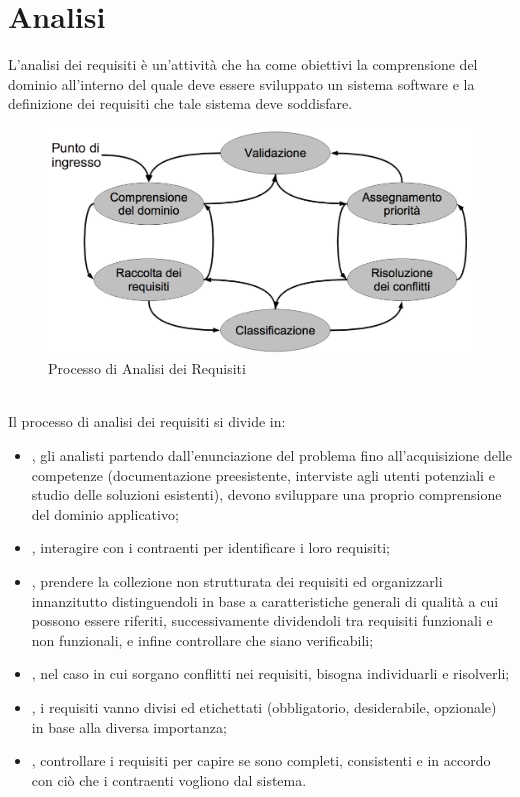 \section{Analisi}
L'analisi dei requisiti \`e un'attivit\`a che ha come obiettivi la comprensione
del dominio all'interno del quale deve essere sviluppato un sistema software e
la definizione dei requisiti che tale sistema deve soddisfare.\\ 
\begin{figure}[h]
  \centering
  \includegraphics[height=6cm]{img/NP/ProcessoAR.png}
\caption{Processo di Analisi dei Requisiti}
\end{figure}\\
Il processo di analisi dei requisiti si divide in:
\begin{itemize}
  \item {}, gli analisti partendo dall'enunciazione
  del problema fino all'acquisizione delle competenze (documentazione
  preesistente, interviste agli utenti potenziali e studio delle soluzioni
  esistenti), devono sviluppare una proprio comprensione del dominio
  applicativo;
  \item {}, interagire con i contraenti per
  identificare i loro requisiti;
  \item {}, prendere la collezione non strutturata dei
  requisiti ed organizzarli innanzitutto distinguendoli in base a
  caratteristiche generali di qualit\`a a cui possono essere riferiti,
  successivamente dividendoli tra requisiti funzionali e non funzionali, e
  infine controllare che siano verificabili;
  \item {}, nel caso in cui sorgano conflitti nei
  requisiti, bisogna individuarli e risolverli;
  \item {}, i requisiti vanno divisi ed
  etichettati (obbligatorio, desiderabile, opzionale) in base alla diversa
  importanza;
  \item {}, controllare i requisiti per capire se
  sono completi, consistenti e in accordo con ci\`o che i contraenti vogliono
  dal sistema.
\end{itemize}
